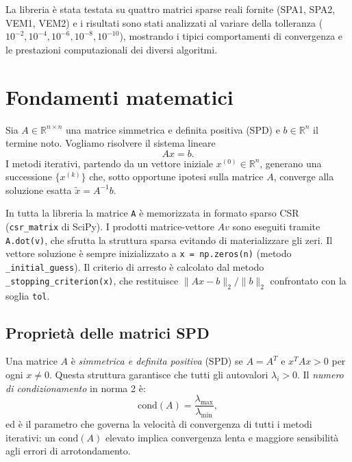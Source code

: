 \documentclass[a4paper,12pt]{article}
\begin{document}
La libreria è stata testata su quattro matrici sparse reali fornite (SPA1, SPA2, VEM1, VEM2) e i risultati sono stati analizzati al variare della tolleranza ($10^{-2}, 10^{-4}, 10^{-6}, 10^{-8}, 10^{-10}$), mostrando i tipici comportamenti di convergenza e le prestazioni computazionali dei diversi algoritmi.


\section{Fondamenti matematici}
\label{sec:math}
 
Sia $A \in \mathbb{R}^{n \times n}$ una matrice simmetrica e definita positiva (SPD) e
$b \in \mathbb{R}^n$ il termine noto. Vogliamo risolvere il sistema lineare
\begin{equation}
    Ax = b.
\end{equation}
I metodi iterativi, partendo da un vettore iniziale $x^{(0)} \in \mathbb{R}^n$,
generano una successione $\{x^{(k)}\}$ che, sotto opportune ipotesi sulla matrice $A$,
converge alla soluzione esatta $\widetilde{x} = A^{-1}b$.

\begin{implbox}
In tutta la libreria la matrice \texttt{A} è memorizzata in formato sparso CSR
(\texttt{csr\_matrix} di SciPy). I prodotti matrice-vettore $Av$ sono eseguiti
tramite \texttt{A.dot(v)}, che sfrutta la struttura sparsa evitando di
materializzare gli zeri. Il vettore soluzione è sempre inizializzato a
\texttt{x = np.zeros(n)} (metodo \texttt{\_initial\_guess}). Il criterio di
arresto è calcolato dal metodo \texttt{\_stopping\_criterion(x)}, che restituisce
$\|Ax - b\|_2 / \|b\|_2$ confrontato con la soglia \texttt{tol}.
\end{implbox}

\subsection{Proprietà delle matrici SPD}
Una matrice $A$ è \emph{simmetrica e definita positiva} (SPD) se $A = A^T$ e
$x^T A x > 0$ per ogni $x \neq 0$.
Questa struttura garantisce che tutti gli autovalori $\lambda_i > 0$. Il
\emph{numero di condizionamento} in norma 2 è:
\begin{equation}
    \mathrm{cond}(A) = \frac{\lambda_{\max}}{\lambda_{\min}},
\end{equation}
ed è il parametro che governa la velocità di convergenza di tutti i metodi
iterativi: un $\mathrm{cond}(A)$ elevato implica convergenza lenta e maggiore
sensibilità agli errori di arrotondamento.
 
\end{document}
